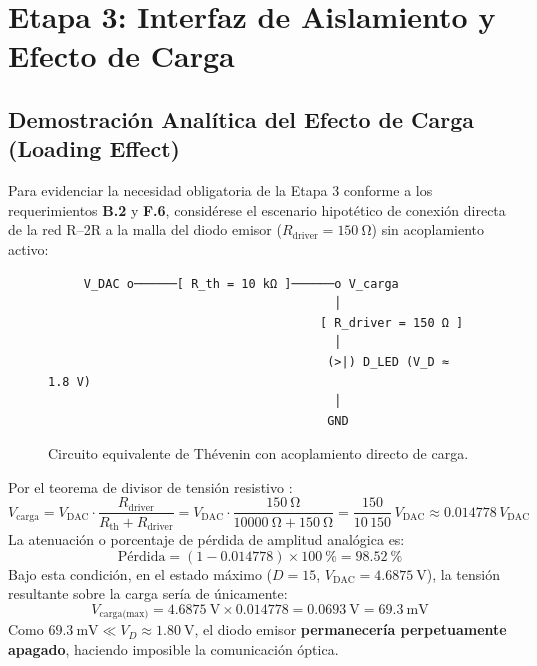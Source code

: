 \documentclass[11pt,letterpaper]{article}
\begin{document}
\section{Etapa 3: Interfaz de Aislamiento y Efecto de Carga}

\subsection{Demostración Analítica del Efecto de Carga (Loading Effect)}
Para evidenciar la necesidad obligatoria de la Etapa 3 conforme a los requerimientos \textbf{B.2} y \textbf{F.6}, considérese el escenario hipotético de conexión directa de la red R--2R a la malla del diodo emisor ($R_{\text{driver}} = \SI{150}{\ohm}$) sin acoplamiento activo:

\begin{figure}[htbp]
\centering
\small
\begin{verbatim}
     V_DAC o──────[ R_th = 10 kΩ ]──────o V_carga
                                        │
                                      [ R_driver = 150 Ω ]
                                        │
                                       (>|) D_LED (V_D ≈ 1.8 V)
                                        │
                                       GND
\end{verbatim}
\caption{Circuito equivalente de Thévenin con acoplamiento directo de carga.}
\label{fig:loading_effect}
\end{figure}

Por el teorema de divisor de tensión resistivo \cite{alexander2018}:
\begin{equation}
V_{\text{carga}} = V_{\text{DAC}} \cdot \frac{R_{\text{driver}}}{R_{\text{th}} + R_{\text{driver}}} = V_{\text{DAC}} \cdot \frac{\SI{150}{\ohm}}{\SI{10000}{\ohm} + \SI{150}{\ohm}} = \frac{150}{10\,150}\,V_{\text{DAC}} \approx 0.014778\,V_{\text{DAC}}
\label{eq:divisor_carga}
\end{equation}
La atenuación o porcentaje de pérdida de amplitud analógica es:
\begin{equation}
\text{Pérdida} = \left( 1 - 0.014778 \right) \times \SI{100}{\percent} = \mathbf{\SI{98.52}{\percent}}
\label{eq:perdida_carga}
\end{equation}
Bajo esta condición, en el estado máximo ($D=15$, $V_{\text{DAC}} = \SI{4.6875}{\volt}$), la tensión resultante sobre la carga sería de únicamente:
\begin{equation}
V_{\text{carga(max)}} = \SI{4.6875}{\volt} \times 0.014778 = \SI{0.0693}{\volt} = \SI{69.3}{\milli\volt}
\end{equation}
Como $\SI{69.3}{\milli\volt} \ll V_D \approx \SI{1.80}{\volt}$, el diodo emisor \textbf{permanecería perpetuamente apagado}, haciendo imposible la comunicación óptica.
\end{document}
